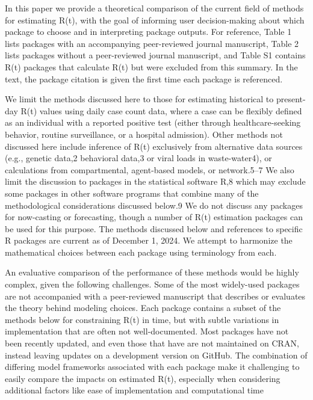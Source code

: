 \documentclass[
  letterpaper,
  DIV=11,
  numbers=noendperiod]{scrreprt}
\begin{document}
In this paper we provide a theoretical comparison of the current field
of methods for estimating R(t), with the goal of informing user
decision-making about which package to choose and in interpreting
package outputs. For reference, Table 1 lists packages with an
accompanying peer-reviewed journal manuscript, Table 2 lists packages
without a peer-reviewed journal manuscript, and Table S1 contains R(t)
packages that calculate R(t) but were excluded from this summary. In the
text, the package citation is given the first time each package is
referenced.

We limit the methods discussed here to those for estimating historical
to present-day R(t) values using daily case count data, where a case can
be flexibly defined as an individual with a reported positive test
(either through healthcare-seeking behavior, routine surveillance, or a
hospital admission). Other methods not discussed here include inference
of R(t) exclusively from alternative data sources (e.g., genetic data,2
behavioral data,3 or viral loads in waste-water4), or calculations from
compartmental, agent-based models, or network.5--7 We also limit the
discussion to packages in the statistical software R,8 which may exclude
some packages in other software programs that combine many of the
methodological considerations discussed below.9 We do not discuss any
packages for now-casting or forecasting, though a number of R(t)
estimation packages can be used for this purpose. The methods discussed
below and references to specific R packages are current as of December
1, 2024. We attempt to harmonize the mathematical choices between each
package using terminology from each.

An evaluative comparison of the performance of these methods would be
highly complex, given the following challenges. Some of the most
widely-used packages are not accompanied with a peer-reviewed manuscript
that describes or evaluates the theory behind modeling choices. Each
package contains a subset of the methods below for constraining R(t) in
time, but with subtle variations in implementation that are often not
well-documented. Most packages have not been recently updated, and even
those that have are not maintained on CRAN, instead leaving updates on a
development version on GitHub. The combination of differing model
frameworks associated with each package make it challenging to easily
compare the impacts on estimated R(t), especially when considering
additional factors like ease of implementation and computational time
\end{document}
